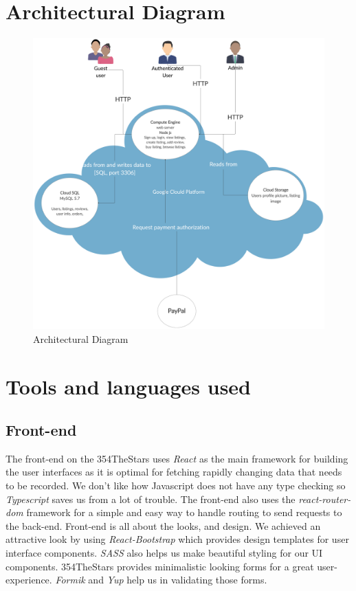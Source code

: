 \documentclass[11pt]{article}
\newcounter{use case ID}
\newcounter{req ID}
\begin{document}
\section{Architectural Diagram}
\begin{figure}[ht!]
    \centering
    \includegraphics[width=\textwidth,height=0.6\paperheight]{Diagrams/Class/Architectural_diagram.png}
    \caption{Architectural Diagram}
    \label{fig: Architectural Diagram}
\end{figure}
\section{Tools and languages used}
    \subsection{Front-end}
        The front-end on the 354TheStars uses \textit{React} as the main framework for building the user interfaces as it is optimal for fetching rapidly changing data that needs to be recorded. We don't like how Javascript does not have any type checking so \textit{Typescript} saves us from a lot of trouble.
        The front-end also uses the \textit{react-router-dom} framework for a simple and easy way to handle routing to send requests to the back-end. 
        Front-end is all about the looks, and design. We achieved an attractive look by using  \textit{React-Bootstrap}  which provides design templates for user interface components. \textit{SASS} also helps us make beautiful styling for our UI components. 
        354TheStars provides minimalistic looking forms for a great user-experience. \textit{Formik} and \textit{Yup} help us in validating those forms.
\end{document}
